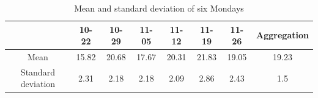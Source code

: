 \documentclass[12pt,a4paper]{report}
\begin{document}
                \begin{table}[ht]
                    \label{table_mean_std_monday}
                    \centering
                    \begin{tabulary}{\linewidth}{c |c c c c c c c}
                        \hline
                         & 10-22 & 10-29 & 11-05 & 11-12 & 11-19 & 11-26 & Aggregation\\ \hline
                        Mean & 15.82 & 20.68 & 17.67 & 20.31 & 21.83 & 19.05 & 19.23\\
                        Standard deviation & 2.31 & 2.18 & 2.18 & 2.09 &2.86 & 2.43 & 1.5\\
                        \hline
                    \end{tabulary}
                    \caption{Mean and standard deviation of six Mondays}
                \end{table}
\end{document}

